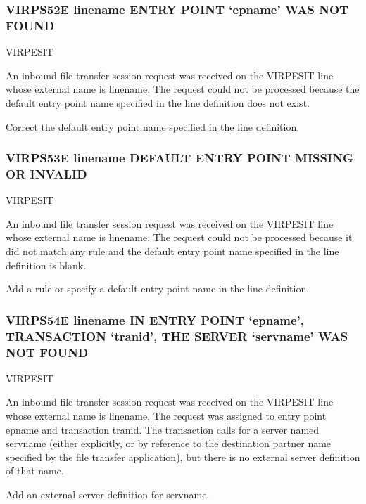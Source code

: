 \documentclass[letterpaper,10pt,english]{sphinxmanual}
\begin{document}
\subsubsection{VIRPS52E linename ENTRY POINT ‘epname’ WAS NOT FOUND}
\label{\detokenize{messages:virps52e-linename-entry-point-epname-was-not-found}}\begin{description}
\sphinxAtStartPar
VIRPESIT

\sphinxAtStartPar
An inbound file transfer session request was received on the VIRPESIT line whose external name is linename. The request could not be processed because the default entry point name specified in the line definition does not exist.

\sphinxAtStartPar
Correct the default entry point name specified in the line definition.

\end{description}


\subsubsection{VIRPS53E linename DEFAULT ENTRY POINT MISSING OR INVALID}
\label{\detokenize{messages:virps53e-linename-default-entry-point-missing-or-invalid}}\begin{description}
\sphinxAtStartPar
VIRPESIT

\sphinxAtStartPar
An inbound file transfer session request was received on the VIRPESIT line whose external name is linename. The request could not be processed because it did not match any rule and the default entry point name specified in the line definition is blank.

\sphinxAtStartPar
Add a rule or specify a default entry point name in the line definition.

\end{description}


\subsubsection{VIRPS54E linename IN ENTRY POINT ‘epname’, TRANSACTION ‘tranid’, THE SERVER ‘servname’ WAS NOT FOUND}
\label{\detokenize{messages:virps54e-linename-in-entry-point-epname-transaction-tranid-the-server-servname-was-not-found}}\begin{description}
\sphinxAtStartPar
VIRPESIT

\sphinxAtStartPar
An inbound file transfer session request was received on the VIRPESIT line whose external name is linename.       The request was assigned to entry point epname and transaction tranid. The transaction calls for a server named servname (either explicitly, or by reference to the destination partner name specified by the file transfer application), but there is no external server definition of that name.

\sphinxAtStartPar
Add an external server definition for servname.

\end{description}
\end{document}
